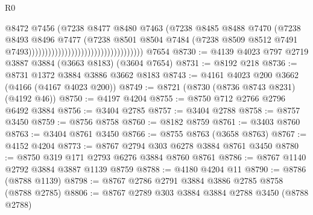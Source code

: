\begin{lexlean}{R0}
\begin{coremodule}
                                                                @8472
                                                                @7456
                                                                (@7238
                                                                  @8477
                                                                  @8480
                                                                  @7463
                                                                  (@7238
                                                                    @8485
                                                                    @8488
                                                                    @7470
                                                                    (@7238
                                                                      @8493
                                                                      @8496
                                                                      @7477
                                                                      (@7238
                                                                        @8501
                                                                        @8504
                                                                        @7484
                                                                        (@7238
                                                                          @8509
                                                                          @8512
                                                                          @7491
                                                                          @7493)))))))))))))))))))))))))))))))))))
    @7654
@8730 := @4139 @4023 @797 @2719 @3887 @3884 (@3663 @8183) (@3604 @7654)
@8731 := @8192 @218
@8736 := @8731 @1372 @3884 @3886 @3662 @8183
@8743 := @4161 @4023 @200 @3662 (@4166 (@4167 @4023 @200))
@8749 := @8721 (@8730 (@8736 @8743 @8231) (@4192 @46))
@8750 := @4197 @4204
@8755 := @8750 @712 @2766 @2796 @6492 @3884
@8756 := @3404 @2785
@8757 := @3404 @2788
@8758 := @8757 @3450
@8759 := @8756 @8758
@8760 := @8182 @8759
@8761 := @3403 @8760
@8763 := @3404 @8761 @3450
@8766 := @8755 @8763 (@3658 @8763)
@8767 := @4152 @4204
@8773 := @8767 @2794 @303 @6278 @3884 @8761 @3450
@8780 := @8750 @319 @171 @2793 @6276 @3884 @8760 @8761
@8786 := @8767 @1140 @2792 @3884 @3887 @1139 @8759
@8788 := @4180 @4204 @11
@8790 := @8786 (@8788 @1139)
@8798 := @8767 @2786 @2791 @3884 @3886 @2785 @8758 (@8788 @2785)
@8806 := @8767 @2789 @303 @3884 @3884 @2788 @3450 (@8788 @2788)

\end{coremodule}
\end{lexlean}
